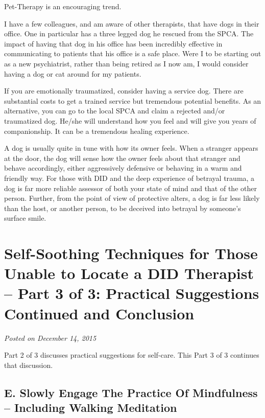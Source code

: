 \documentclass[]{book}
\begin{document}
Pet-Therapy is an encouraging trend.

I have a few colleagues, and am aware of other therapists, that have dogs in their office. One in particular has a three legged dog he rescued from the SPCA. The impact of having that dog in his office has been incredibly effective in communicating to patients that his office is a safe place. Were I to be starting out as a new psychiatrist, rather than being retired as I now am, I would consider having a dog or cat around for my patients.

If you are emotionally traumatized, consider having a service dog. There are substantial costs to get a trained service but tremendous potential benefits. As an alternative, you can go to the local SPCA and claim a rejected and/or traumatized dog. He/she will understand how you feel and will give you years of companionship. It can be a tremendous healing experience.

A dog is usually quite in tune with how its owner feels. When a stranger appears at the door, the dog will sense how the owner feels about that stranger and behave accordingly, either aggressively defensive or behaving in a warm and friendly way. For those with DID and the deep experience of betrayal trauma, a dog is far more reliable assessor of both your state of mind and that of the other person. Further, from the point of view of protective alters, a dog is far less likely than the host, or another person, to be deceived into betrayal by someone's surface smile.

\hypertarget{self-soothing-techniques-for-those-unable-to-locate-a-did-therapist-part-3-of-3-practical-suggestions-continued-and-conclusion}{%
\section{Self-Soothing Techniques for Those Unable to Locate a DID Therapist -- Part 3 of 3: Practical Suggestions Continued and Conclusion}\label{self-soothing-techniques-for-those-unable-to-locate-a-did-therapist-part-3-of-3-practical-suggestions-continued-and-conclusion}}

\emph{Posted on December 14, 2015}

Part 2 of 3 discusses practical suggestions for self-care. This Part 3 of 3 continues that discussion.

\hypertarget{e.-slowly-engage-the-practice-of-mindfulness-including-walking-meditation}{%
\subsection*{E. Slowly Engage The Practice Of Mindfulness -- Including Walking Meditation}\label{e.-slowly-engage-the-practice-of-mindfulness-including-walking-meditation}}
\end{document}
